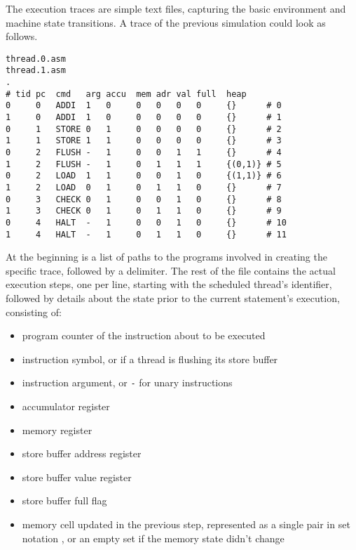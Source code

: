 The execution traces are simple text files, capturing the basic environment and machine state transitions.
A trace of the previous simulation could look as follows.

\begin{lstlisting}[style=asm, caption={Simple Output Trace}, label={lst:trace:simple}, xleftmargin=\parindent]
thread.0.asm
thread.1.asm
.
# tid pc  cmd   arg accu  mem adr val full  heap
0     0   ADDI  1   0     0   0   0   0     {}      # 0
1     0   ADDI  1   0     0   0   0   0     {}      # 1
0     1   STORE 0   1     0   0   0   0     {}      # 2
1     1   STORE 1   1     0   0   0   0     {}      # 3
0     2   FLUSH -   1     0   0   1   1     {}      # 4
1     2   FLUSH -   1     0   1   1   1     {(0,1)} # 5
0     2   LOAD  1   1     0   0   1   0     {(1,1)} # 6
1     2   LOAD  0   1     0   1   1   0     {}      # 7
0     3   CHECK 0   1     0   0   1   0     {}      # 8
1     3   CHECK 0   1     0   1   1   0     {}      # 9
0     4   HALT  -   1     0   0   1   0     {}      # 10
1     4   HALT  -   1     0   1   1   0     {}      # 11
\end{lstlisting}

At the beginning is a list of paths to the programs involved in creating the specific trace, followed by a delimiter.
The rest of the file contains the actual execution steps, one per line, starting with the scheduled thread's identifier, followed by details about the state prior to the current statement's execution, consisting of:

\begin{itemize}
  \item program counter of the instruction about to be executed
  \item instruction symbol, or  if a thread is flushing its store buffer
  \item instruction argument, or \texttt{-} for unary instructions
  \item accumulator register
  \item {} memory register
  \item store buffer address register
  \item store buffer value register
  \item store buffer full flag
  \item memory cell updated in the previous step, represented as a single pair in set notation \texttt{}, or an empty set \texttt{\string{\string}} if the memory state didn't change
\end{itemize}

